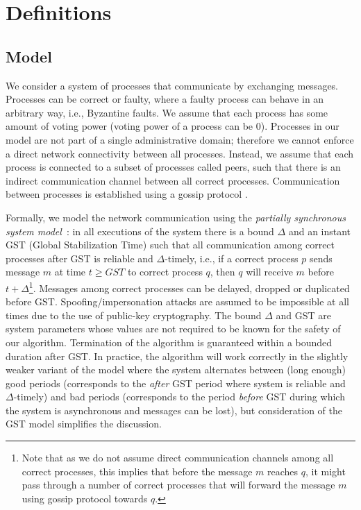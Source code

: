 \section{Definitions} \label{sec:definitions}

\subsection{Model}

We consider a system of processes that communicate by exchanging messages.
Processes can be correct or faulty, where a faulty process can behave in an
arbitrary way, i.e., Byzantine faults. We assume that each process
has some amount of voting power (voting power of a process can be $0$).
Processes in our model are not part of a single administrative domain;
therefore we cannot enforce a direct network connectivity between all
processes. Instead, we assume that each process is connected to a subset of
processes called peers, such that there is an indirect communication channel
between all correct processes. Communication between processes is established
using a gossip protocol \cite{Dem1987:gossip}.

Formally, we model the network communication using the \emph{partially
synchronous system model}~\cite{DLS88:jacm}: in all executions of the system
there is a bound $\Delta$ and an instant GST (Global Stabilization Time) such
that all communication among correct processes after GST is reliable and
$\Delta$-timely, i.e., if a correct process $p$ sends message $m$ at time $t
\ge GST$ to correct process $q$, then $q$ will receive $m$ before $t +
\Delta$\footnote{Note that as we do not assume direct communication channels
    among all correct processes, this implies that before the message $m$
    reaches $q$, it might pass through a number of correct processes that will
forward the message $m$ using gossip protocol towards $q$.}. Messages among
correct processes can be delayed, dropped or duplicated before GST.
Spoofing/impersonation attacks are assumed to be impossible at all times due to
the use of public-key cryptography. The bound $\Delta$ and GST are system
parameters whose values are not required to be known for the safety of our
algorithm. Termination of the algorithm is guaranteed within a bounded duration
after GST.  In practice, the algorithm will work correctly in the slightly
weaker variant of the model where the system alternates between (long enough)
good periods (corresponds to the \emph{after} GST period where system is
reliable and $\Delta$-timely) and bad periods (corresponds to the period
\emph{before} GST during which the system is asynchronous and messages can be
lost), but consideration of the GST model simplifies the discussion.  

